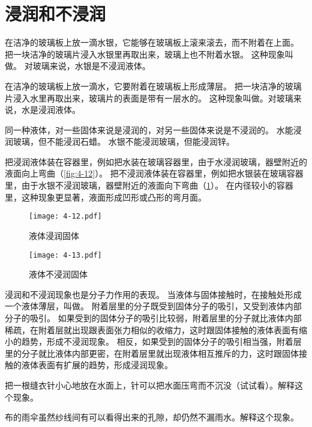 \section{浸润和不浸润}
在洁净的玻璃板上放一滴水银，它能够在玻璃板上滚来滚去，而不附着在上面。
把一块洁净的玻璃片浸入水银里再取出来，玻璃上也不附着水银。
这种现象叫做。
对玻璃来说，水银是不浸润液体。

在洁净的玻璃板上放一滴水，它要附着在玻璃板上形成薄层。
把一块洁净的玻璃片浸入水里再取出来，玻璃片的表面是带有一层水的。
这种现象叫做。对玻璃来说，水是浸润液体。

同一种液体，对一些固体来说是浸润的，对另一些固体来说是不浸润的。
水能浸润玻璃，但不能浸润石蜡。
水银不能浸润玻璃，但能浸润锌。

把浸润液体装在容器里，例如把水装在玻璃容器里，由于水浸润玻璃，器壁附近的液面向上弯曲（\cref{fig:4-12}）。
把不浸润液体装在容器里，例如把水银装在玻璃容器里，由于水银不浸润玻璃，器壁附近的液面向下弯曲（\cref{fig:4-13}）。
在内径较小的容器里，这种现象更显著，液面形成凹形或凸形的弯月面。

\begin{figure}
	\begin{minipage}[b]{0.48\linewidth}\centering
		\texttt{[image: 4-12.pdf]}
		\caption{液体浸润固体}\label{fig:4-12}
	\end{minipage}
	\begin{minipage}[b]{0.48\linewidth}\centering
		\texttt{[image: 4-13.pdf]}
		\caption{液体不浸润固体}\label{fig:4-13}
  \end{minipage}
\end{figure}

浸润和不浸润现象也是分子力作用的表现。
当液体与固体接触时，在接触处形成一个液体薄层，叫做。
附着层里的分子既受到固体分子的吸引，又受到液体内部分子的吸引。
如果受到的固体分子的吸引比较弱，附着层里的分子就比液体内部稀疏，在附着层就出现跟表面张力相似的收缩力，这时跟固体接触的液体表面有缩小的趋势，形成不浸润现象。
相反，如果受到的固体分子的吸引相当强，附着层里的分子就比液体内部更密，在附着层里就出现液体相互推斥的力，这时跟固体接触的液体表面有扩展的趋势，形成浸润现象。

\begin{Practice}
\begin{question}
	\item 把一根缝衣针小心地放在水面上，针可以把水面压弯而不沉没（试试看）。解释这个现象。
	\item 布的雨伞虽然纱线间有可以看得出来的孔隙，却仍然不漏雨水。解释这个现象。
\end{question}
\end{Practice}

